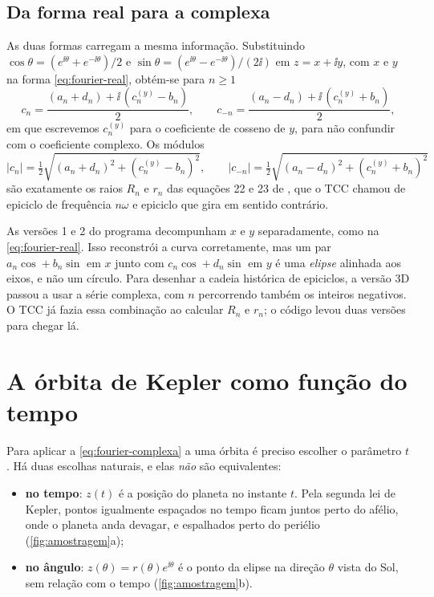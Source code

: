 \subsection{Da forma real para a complexa}

As duas formas carregam a mesma informação. Substituindo $\cos\theta = (e^{\ii\theta}+e^{-\ii\theta})/2$ e $\sin\theta = (e^{\ii\theta}-e^{-\ii\theta})/(2\ii)$ em $z = x + \ii y$, com $x$ e $y$ na forma \eqref{eq:fourier-real}, obtém-se para $n\geq1$
\begin{equation}
  c_{n} = \frac{(a_n + d_n) + \ii\,(c_n^{(y)} - b_n)}{2},
  \qquad
  c_{-n} = \frac{(a_n - d_n) + \ii\,(c_n^{(y)} + b_n)}{2},
  \label{eq:real-complexa}
\end{equation}
em que escrevemos $c_n^{(y)}$ para o coeficiente de cosseno de $y$, para não confundir com o coeficiente complexo. Os módulos
\[
  |c_n| = \tfrac12\sqrt{(a_n+d_n)^2 + (c_n^{(y)}-b_n)^2},\qquad
  |c_{-n}| = \tfrac12\sqrt{(a_n-d_n)^2 + (c_n^{(y)}+b_n)^2}
\]
são exatamente os raios $R_n$ e $r_n$ das equações 22 e 23 de , que o TCC chamou de epiciclo de frequência $n\omega$ e epiciclo que gira em sentido contrário.

\begin{licao}
As versões 1 e 2 do programa decompunham $x$ e $y$ separadamente, como na \autoref{eq:fourier-real}. Isso reconstrói a curva corretamente, mas um par $a_n\cos + b_n\sin$ em $x$ junto com $c_n\cos + d_n\sin$ em $y$ é uma \emph{elipse} alinhada aos eixos, e não um círculo. Para desenhar a cadeia histórica de epiciclos, a versão 3D passou a usar a série complexa, com $n$ percorrendo também os inteiros negativos. O TCC já fazia essa combinação ao calcular $R_n$ e $r_n$; o código levou duas versões para chegar lá.
\end{licao}

\section{A órbita de Kepler como função do tempo}\label{sec:param-tempo}

Para aplicar a \autoref{eq:fourier-complexa} a uma órbita é preciso escolher o parâmetro $t$. Há duas escolhas naturais, e elas \emph{não} são equivalentes:

\begin{itemize}
  \item \textbf{no tempo}: $z(t)$ é a posição do planeta no instante $t$. Pela segunda lei de Kepler, pontos igualmente espaçados no tempo ficam juntos perto do afélio, onde o planeta anda devagar, e espalhados perto do periélio (\autoref{fig:amostragem}a);
  \item \textbf{no ângulo}: $z(\theta) = r(\theta)e^{\ii\theta}$ é o ponto da elipse na direção $\theta$ vista do Sol, sem relação com o tempo (\autoref{fig:amostragem}b).
\end{itemize}

